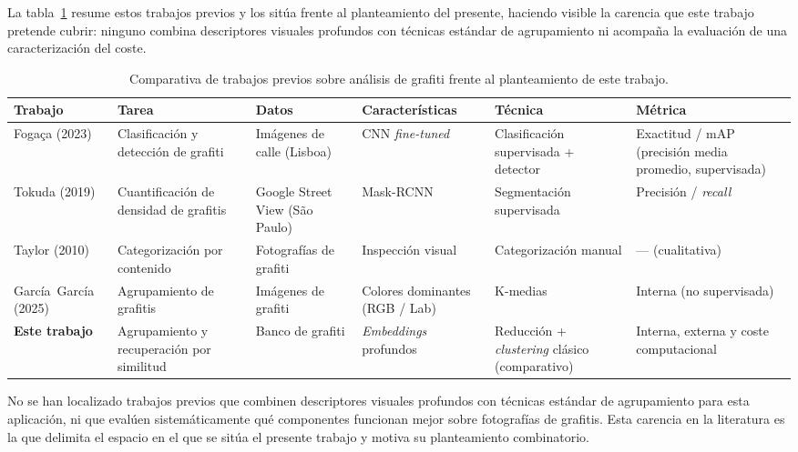 La tabla~\ref{tab:art-comparativa} resume estos trabajos previos y los sitúa
frente al planteamiento del presente, haciendo visible la carencia que este
trabajo pretende cubrir: ninguno combina descriptores visuales profundos con
técnicas estándar de agrupamiento ni acompaña la evaluación de una
caracterización del coste.

\begin{table}[h]
  \centering
{\scriptsize
\setlength{\tabcolsep}{3pt}
\begin{tabular}{|p{1.9cm}|p{2.1cm}|p{2.0cm}|p{2.2cm}|p{2.2cm}|p{1.9cm}|} \hline
  \textbf{Trabajo} & \textbf{Tarea} & \textbf{Datos} & \textbf{Características} & \textbf{Técnica} & \textbf{Métrica} \\ \hline
  Fogaça (2023) & Clasificación y detección de grafiti & Imágenes de calle (Lisboa) & CNN \textit{fine-tuned} & Clasificación supervisada + detector & Exactitud / mAP (precisión media promedio, supervisada) \\ \hline
  Tokuda (2019) & Cuantificación de densidad de grafitis & Google Street View (São Paulo) & Mask-RCNN & Segmentación supervisada & Precisión / \textit{recall} \\ \hline
  Taylor (2010) & Categorización por contenido & Fotografías de grafiti & Inspección visual & Categorización manual & --- (cualitativa) \\ \hline
  García~García (2025) & Agrupamiento de grafitis & Imágenes de grafiti & Colores dominantes (RGB / Lab) & K-medias & Interna (no supervisada) \\ \hline
  \textbf{Este trabajo} & Agrupamiento y recuperación por similitud & Banco de grafiti & \textit{Embeddings} profundos & Reducción + \textit{clustering} clásico (comparativo) & Interna, externa y coste computacional \\ \hline
\end{tabular}
}
  \caption[Comparativa de trabajos previos sobre análisis de grafiti]{Comparativa de trabajos previos sobre análisis de grafiti frente al
  planteamiento de este trabajo.}
  \label{tab:art-comparativa}
\end{table}

No se han localizado trabajos previos que combinen descriptores visuales
profundos con técnicas estándar de agrupamiento para esta aplicación, ni que
evalúen sistemáticamente qué componentes funcionan mejor sobre fotografías de
grafitis. Esta carencia en la literatura es la que delimita el espacio en el
que se sitúa el presente trabajo y motiva su planteamiento combinatorio.

